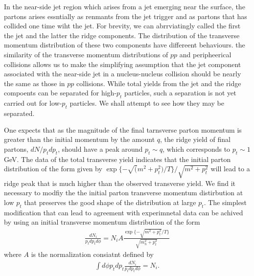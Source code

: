\documentclass[showpacs,preprintnumbers,amsmath,amssymb,floatfix]{revtex4}
\begin{document}
In the near-side jet region which arises from a jet emerging near the
surface, the partons arises essntially as renmants from the jet
trigger and as partons that has collided one time wiht the jet.  For
brevity, we can abrrviatingly called the first the jet and the latter
the ridge components.  The distribution of the transverse momentum
distribution of these two components have differeent behaviours.  the
similarity of the transverse momentum distributions of $pp$ and
peripheerical collisions allows us to make the simplifying assumption
that the jet component associated with the near-side jet in a
nucleus-nucleus collision should be nearly the same as those in $pp$
collisions.  While total yields from the jet and the ridge compoents
can be separated for high-$p_t$ particles, such a separation is not
yet carried out for low-$p_t$ particles.  We shall attempt to see how
they may be separated.

One expects that as the magnitude of the final tarnsverse parton
momentum is greater than the initial momentum by the amount $q$, the
ridge yield of final partons, $dN/p_t dp_t$, should have a peak around
$p_t\sim q$, which corresponds to $p_t\sim 1 $ GeV.  The data of the
total transverse yield indicates that the initial parton distribution
of the form given by $\exp\{ -\sqrt(m^2+p_t^2)/T \}/\sqrt{m^2+p_t^2}$
will lead to a ridge peak that is much higher than the observed
transverse yield. We find it necessary to modfiy the the initial
parton transverse momentum distirbution at low $p_t$ that preserves
the good shape of the distribution at large $p_t$.  The simplest
modification that can lead to agreement with experimnetal data can be achived by using an initial  transverse momentum distribution of the form
\begin{eqnarray}
\frac { dN_i} {p_t dp_t d\phi}= N_i A
\frac{\exp\{-\sqrt{m^2+p_t^2}/T\}} {\sqrt{m_h^2+p_t^2}}
\end{eqnarray}
where $A$ is the normalization consiatnt defined by
\begin{eqnarray}
\int d \phi p_t dp_t \frac { dN_i} {p_t dp_t d\phi}= N_i. 
\end{eqnarray}
\end{document}
